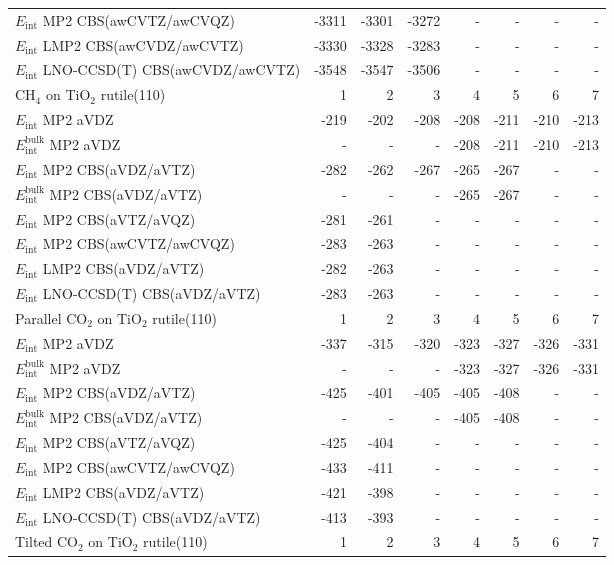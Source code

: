 \begin{longtable}{lrrrrrrr}
$E_\text{int}$ MP2 CBS(awCVTZ/awCVQZ) & -3311 & -3301 & -3272 & - & - & - & - \\
$E_\text{int}$ LMP2 CBS(awCVDZ/awCVTZ) & -3330 & -3328 & -3283 & - & - & - & - \\
$E_\text{int}$ LNO-CCSD(T) CBS(awCVDZ/awCVTZ) & -3548 & -3547 & -3506 & - & - & - & - \\
\toprule
CH$_4$ on TiO$_2$ rutile(110) & 1 & 2 & 3 & 4 & 5 & 6 & 7 \\ 
\midrule
$E_\text{int}$ MP2 aVDZ & -219 & -202 & -208 & -208 & -211 & -210 & -213 \\
$E_\text{int}^\text{bulk}$ MP2 aVDZ & - & - & - & -208 & -211 & -210 & -213 \\
$E_\text{int}$ MP2 CBS(aVDZ/aVTZ) & -282 & -262 & -267 & -265 & -267 & - & - \\
$E_\text{int}^\text{bulk}$ MP2 CBS(aVDZ/aVTZ) & - & - & - & -265 & -267 & - & - \\
$E_\text{int}$ MP2 CBS(aVTZ/aVQZ) & -281 & -261 & - & - & - & - & - \\
$E_\text{int}$ MP2 CBS(awCVTZ/awCVQZ) & -283 & -263 & - & - & - & - & - \\
$E_\text{int}$ LMP2 CBS(aVDZ/aVTZ) & -282 & -263 & - & - & - & - & - \\
$E_\text{int}$ LNO-CCSD(T) CBS(aVDZ/aVTZ) & -283 & -263 & - & - & - & - & - \\
\toprule
Parallel CO$_2$ on TiO$_2$ rutile(110) & 1 & 2 & 3 & 4 & 5 & 6 & 7 \\ 
\midrule
$E_\text{int}$ MP2 aVDZ & -337 & -315 & -320 & -323 & -327 & -326 & -331 \\
$E_\text{int}^\text{bulk}$ MP2 aVDZ & - & - & - & -323 & -327 & -326 & -331 \\
$E_\text{int}$ MP2 CBS(aVDZ/aVTZ) & -425 & -401 & -405 & -405 & -408 & - & - \\
$E_\text{int}^\text{bulk}$ MP2 CBS(aVDZ/aVTZ) & - & - & - & -405 & -408 & - & - \\
$E_\text{int}$ MP2 CBS(aVTZ/aVQZ) & -425 & -404 & - & - & - & - & - \\
$E_\text{int}$ MP2 CBS(awCVTZ/awCVQZ) & -433 & -411 & - & - & - & - & - \\
$E_\text{int}$ LMP2 CBS(aVDZ/aVTZ) & -421 & -398 & - & - & - & - & - \\
$E_\text{int}$ LNO-CCSD(T) CBS(aVDZ/aVTZ) & -413 & -393 & - & - & - & - & - \\
\toprule
Tilted CO$_2$ on TiO$_2$ rutile(110) & 1 & 2 & 3 & 4 & 5 & 6 & 7 \\ 

\end{longtable}
